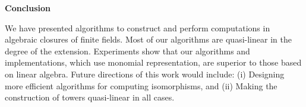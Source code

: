 

\vspace*{2in}
\begin{center}
	\large
	\textbf{Conclusion}
\end{center}
\vspace*{1cm}

We have presented algorithms to construct and perform computations in algebraic closures of finite 
fields. Most of our algorithms are quasi-linear in the degree of the extension. Experiments show 
that our algorithms and implementations, which use monomial representation, are superior to 
those based on linear algebra. Future directions of this work would include: (i) Designing more 
efficient algorithms for computing isomorphisms, and (ii) Making the construction of towers 
quasi-linear in all cases.
 
